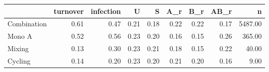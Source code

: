 \begin{tabular}{lrrrrrrrr}
\toprule
 & turnover & infection & U & S & A\_r & B\_r & AB\_r & n \\
\midrule
Combination & 0.61 & 0.47 & 0.21 & 0.18 & 0.22 & 0.22 & 0.17 & 5487.00 \\
Mono A & 0.52 & 0.56 & 0.23 & 0.20 & 0.16 & 0.15 & 0.26 & 365.00 \\
Mixing & 0.13 & 0.30 & 0.23 & 0.21 & 0.18 & 0.15 & 0.22 & 40.00 \\
Cycling & 0.14 & 0.20 & 0.23 & 0.20 & 0.21 & 0.20 & 0.16 & 9.00 \\
\bottomrule
\end{tabular}
